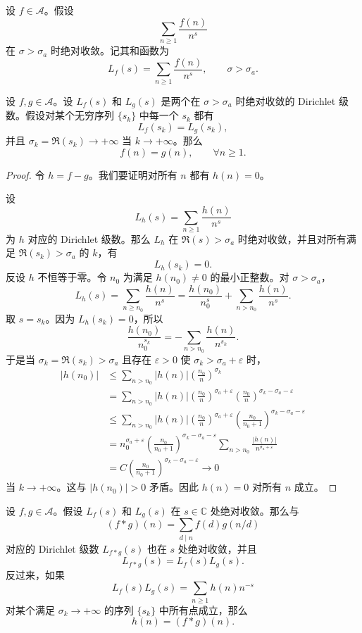 设 $f\in\mathcal A$。假设
\[
	\sum_{n\geq 1}\frac{f(n)}{n^s}
\]
在 $\sigma>\sigma_a$ 时绝对收敛。记其和函数为
\[
	L_f(s)=\sum_{n\geq 1}\frac{f(n)}{n^s},
	\qquad \sigma>\sigma_a.
\]

\begin{theorem}[原文 Theorem 4.5]
	设 $f,g\in\mathcal A$。设 $L_f(s)$ 和 $L_g(s)$ 是两个在 $\sigma>\sigma_a$ 时绝对收敛的 Dirichlet 级数。假设对某个无穷序列 $\{s_k\}$ 中每一个 $s_k$ 都有
	\[
		L_f(s_k)=L_g(s_k),
	\]
	并且 $\sigma_k=\Re(s_k)\to+\infty$ 当 $k\to+\infty$。那么
	\[
		f(n)=g(n),\qquad \forall n\geq 1.
	\]
\end{theorem}

\begin{proof}
	令 $h=f-g$。我们要证明对所有 $n$ 都有 $h(n)=0$。

	设
	\[
		L_h(s)=\sum_{n\geq 1}\frac{h(n)}{n^s}
	\]
	为 $h$ 对应的 Dirichlet 级数。那么 $L_h$ 在 $\Re(s)>\sigma_a$ 时绝对收敛，并且对所有满足 $\Re(s_k)>\sigma_a$ 的 $k$，有
	\[
		L_h(s_k)=0.
	\]
	反设 $h$ 不恒等于零。令 $n_0$ 为满足 $h(n_0)\neq 0$ 的最小正整数。对 $\sigma>\sigma_a$，
	\[
		L_h(s)
		=
		\sum_{n\geq n_0}\frac{h(n)}{n^s}
		=
		\frac{h(n_0)}{n_0^s}
		+
		\sum_{n>n_0}\frac{h(n)}{n^s}.
	\]
	取 $s=s_k$。因为 $L_h(s_k)=0$，所以
	\[
		\frac{h(n_0)}{n_0^{s_k}}
		=
		-
		\sum_{n>n_0}\frac{h(n)}{n^{s_k}}.
	\]
	于是当 $\sigma_k=\Re(s_k)>\sigma_a$ 且存在 $\varepsilon>0$ 使 $\sigma_k>\sigma_a+\varepsilon$ 时，
	\[
	\begin{aligned}
		|h(n_0)|
		&\leq
		\sum_{n>n_0}|h(n)|\left(\frac{n_0}{n}\right)^{\sigma_k}\\
		&=
		\sum_{n>n_0}|h(n)|
		\left(\frac{n_0}{n}\right)^{\sigma_a+\varepsilon}
		\left(\frac{n_0}{n}\right)^{\sigma_k-\sigma_a-\varepsilon}\\
		&\leq
		\sum_{n>n_0}|h(n)|
		\left(\frac{n_0}{n}\right)^{\sigma_a+\varepsilon}
		\left(\frac{n_0}{n_0+1}\right)^{\sigma_k-\sigma_a-\varepsilon}\\
		&=
		n_0^{\sigma_a+\varepsilon}
		\left(\frac{n_0}{n_0+1}\right)^{\sigma_k-\sigma_a-\varepsilon}
		\sum_{n>n_0}\frac{|h(n)|}{n^{\sigma_a+\varepsilon}}\\
		&=
		C\left(\frac{n_0}{n_0+1}\right)^{\sigma_k-\sigma_a-\varepsilon}
		\longrightarrow 0
	\end{aligned}
	\]
	当 $k\to+\infty$。这与 $|h(n_0)|>0$ 矛盾。因此 $h(n)=0$ 对所有 $n$ 成立。
\end{proof}

\begin{theorem}[原文 Theorem 4.6]
	设 $f,g\in\mathcal A$。假设 $L_f(s)$ 和 $L_g(s)$ 在 $s\in\mathbb C$ 处绝对收敛。那么与
	\[
		(f*g)(n)=\sum_{d\mid n}f(d)g(n/d)
	\]
	对应的 Dirichlet 级数 $L_{f*g}(s)$ 也在 $s$ 处绝对收敛，并且
	\[
		L_{f*g}(s)=L_f(s)L_g(s).
	\]
	反过来，如果
	\[
		L_f(s)L_g(s)=\sum_{n\geq 1}h(n)n^{-s}
	\]
	对某个满足 $\sigma_k\to+\infty$ 的序列 $\{s_k\}$ 中所有点成立，那么
	\[
		h(n)=(f*g)(n).
	\]
\end{theorem}

